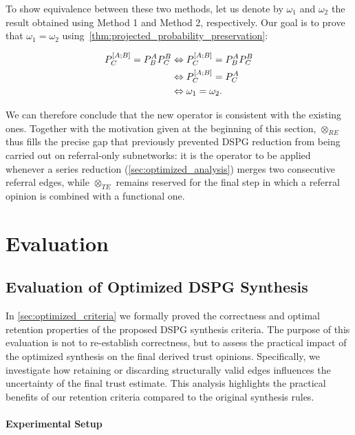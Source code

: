 To show equivalence between these two methods, let us denote by $\omega_1$ and $\omega_2$ the result obtained using Method 1 and Method 2, respectively. 
Our goal is to prove that $\omega_1=\omega_2$ using~\cref{thm:projected_probability_preservation}:

\begin{align}
    \notag
    P_C^{[A;B]} = P_B^{A} P_C^{B} &\Leftrightarrow P_C^{[A;B]}=P^A_BP^B_C \\
    \notag
    &\Leftrightarrow P_C^{[A;B]}=P^A_C  \\
    \notag
    &\Leftrightarrow \omega_1 = \omega_2. \notag
\end{align}

We can therefore conclude that the new operator is consistent with the existing ones. Together with the motivation given at the beginning of this section, $\otimes_{RE}$ thus fills the precise gap that previously prevented \ac{DSPG} reduction from being carried out on referral-only subnetworks: it is the operator to be applied whenever a series reduction (\cref{sec:optimized_analysis}) merges two consecutive referral edges, while $\otimes_{TE}$ remains reserved for the final step in which a referral opinion is combined with a functional one.



\section{Evaluation}
\label{sec:eval_tnasl}
\subsection{Evaluation of Optimized \acs{DSPG} Synthesis}
\label{subsec:eval_synthesis}

In \cref{sec:optimized_criteria} we formally proved the correctness and optimal retention properties of the proposed \ac{DSPG} synthesis criteria. The purpose of this evaluation is not to re-establish correctness, but to assess the practical impact of the optimized synthesis on the final derived trust opinions. Specifically, we investigate how retaining or discarding structurally valid edges influences the uncertainty of the final trust estimate. This analysis highlights the practical benefits of our retention criteria compared to the original synthesis rules.

\paragraph{Experimental Setup}

